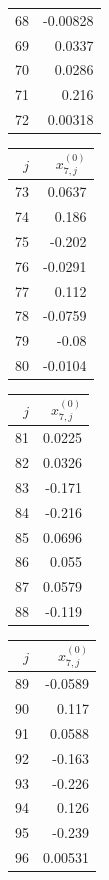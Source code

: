 {\begin{tabular}[t]{r|r}
68 & -0.00828 \\
69 & 0.0337 \\
70 & 0.0286 \\
71 & 0.216 \\
72 & 0.00318
\end{tabular}\kern4pt
\begin{tabular}[t]{r|r}
$j$ & $x^{(0)}_{7,j}$ \\\hline
73 & 0.0637 \\
74 & 0.186 \\
75 & -0.202 \\
76 & -0.0291 \\
77 & 0.112 \\
78 & -0.0759 \\
79 & -0.08 \\
80 & -0.0104
\end{tabular}\kern4pt
\begin{tabular}[t]{r|r}
$j$ & $x^{(0)}_{7,j}$ \\\hline
81 & 0.0225 \\
82 & 0.0326 \\
83 & -0.171 \\
84 & -0.216 \\
85 & 0.0696 \\
86 & 0.055 \\
87 & 0.0579 \\
88 & -0.119
\end{tabular}\kern4pt
\begin{tabular}[t]{r|r}
$j$ & $x^{(0)}_{7,j}$ \\\hline
89 & -0.0589 \\
90 & 0.117 \\
91 & 0.0588 \\
92 & -0.163 \\
93 & -0.226 \\
94 & 0.126 \\
95 & -0.239 \\
96 & 0.00531
\end{tabular}}

